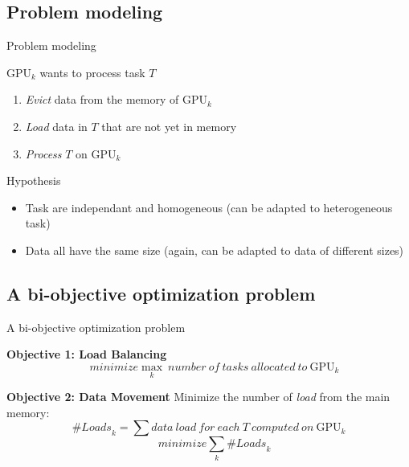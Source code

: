 \documentclass{libs/ufc_format}
\newcommand{\nbloads}{\ensuremath{\mathit{\mathit{\#Loads}}}\xspace}
\newcommand{\GPU}[1]{\ensuremath{\mathrm{GPU}_{#1}}\xspace}
\begin{document}
\subsection{Problem modeling}
\begin{frame}{Problem modeling}
\begin{block}{$\GPU{k}$ wants to process task $T$}
	\begin{enumerate}
		\item \emph{Evict} data from the memory of $\GPU{k}$
		\item \emph{Load} data in $T$ that are not yet in memory
		\item \emph{Process} $T$ on $\GPU{k}$
	\end{enumerate}
\end{block}
\begin{block}{Hypothesis}
	\begin{itemize}
		\item Task are independant and homogeneous (can be adapted to heterogeneous task)
		\item Data all have the same size (again, can be adapted to data of different sizes)
	\end{itemize}
\end{block}
\end{frame}

\subsection{A bi-objective optimization problem}
\begin{frame}{A bi-objective optimization problem}
\begin{block}{\bf Objective 1: Load Balancing}
  $$\quad \mathit{minimize} \max_{k}~number~of~tasks~allocated~to~\GPU{k}$$
\end{block}

\begin{block}{\bf Objective 2: Data Movement}
	Minimize the number of \emph{load} from the main memory:
$$
\nbloads_k =\sum data~load~for~each~T~computed~on~\GPU{k}
$$
  $$\quad  \mathit{minimize} \sum_k \nbloads_k$$
\end{block}


\end{frame}
\end{document}
